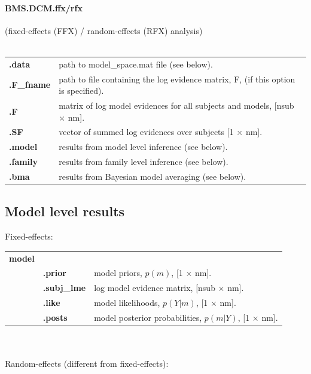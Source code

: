 \paragraph{BMS.DCM.ffx/rfx} (fixed-effects (FFX) / random-effects (RFX) analysis)\\\\

\begin{tabular}{ l l }
\bf{.data}          & path to model\_space.mat file (see below).  \\
\bf{.F\_fname} & path to file containing the log evidence matrix, F, (if this option is specified). \\
\bf{.F}                & matrix of log model evidences for all subjects and models, [nsub $\times$ nm].  \\
\bf{.SF} 	       & vector of summed log evidences over subjects [1 $\times$ nm]. \\
\bf{.model}       & results from model level inference (see below). \\
\bf{.family}       & results from family level inference (see below). \\
\bf{.bma}          & results from Bayesian model averaging (see below). \\
\end{tabular}

\subsection{Model level results}

\hspace{4mm} Fixed-effects:\\

\begin{tabular}{ l l l }
\bf{model}           & & \\
& \bf{.prior}          & model priors, $p(m)$, [1 $\times$ nm]. \\
& \bf{.subj\_lme} & log model evidence matrix, [nsub $\times$ nm]. \\
& \bf{.like}            & model likelihoods, $p(Y|m)$, [1 $\times$ nm]. \\
& \bf{.posts}        & model posterior probabilities, $p(m|Y)$, [1 $\times$ nm]. \\
\end{tabular}\\\\

Random-effects (different from fixed-effects):\\


